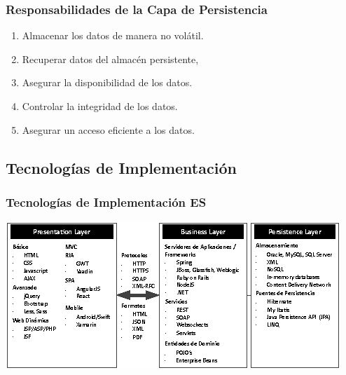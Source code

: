 \documentclass[a4paper,slidestop,xcolor=pst,dvips,blue]{beamer}
\begin{document}
\begin{frame}[c]
	\frametitle{Responsabilidades de la Capa de Persistencia}
	\begin{enumerate}[<+->]
        \item Almacenar los datos de manera no volátil.
        \item Recuperar datos del almacén persistente,
        \item Asegurar la disponibilidad de los datos.
        \item Controlar la integridad de los datos.
        \item Asegurar un acceso eficiente a los datos.
	\end{enumerate}
\end{frame}

\subsection{Tecnologías de Implementación}

\begin{frame}[c]
	\frametitle{Tecnologías de Implementación ES}
	\begin{center}
        \includegraphics[width=\linewidth,keepaspectratio=true]{images/enterpriseLayers/technologies.eps}
	\end{center}
\end{frame}
\end{document}
